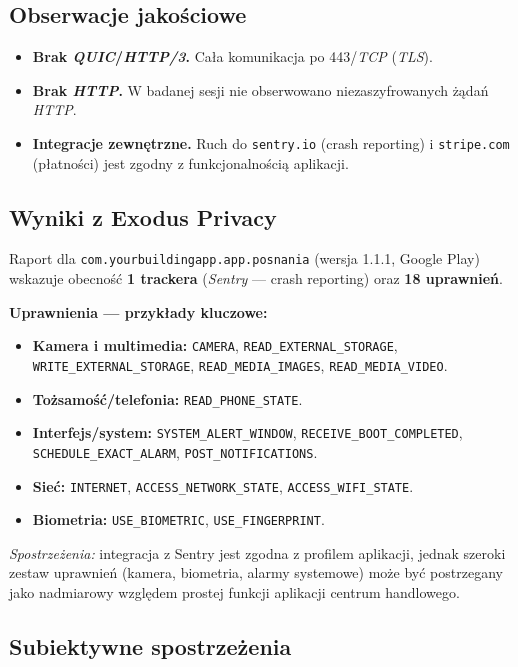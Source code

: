 \subsection{Obserwacje jakościowe}
\begin{itemize}
  \item \textbf{Brak \emph{QUIC}/\emph{HTTP/3}.} Cała komunikacja po 443/\emph{TCP} (\emph{TLS}).
  \item \textbf{Brak \emph{HTTP}.} W badanej sesji nie obserwowano niezaszyfrowanych żądań \emph{HTTP}.
  \item \textbf{Integracje zewnętrzne.} Ruch do \texttt{sentry.io} (crash reporting) i \texttt{stripe.com} (płatności) jest zgodny z funkcjonalnością aplikacji.
\end{itemize}

\subsection{Wyniki z Exodus Privacy \cite{ExodusPrivacy}}
Raport dla \texttt{com.yourbuildingapp.app.posnania} (wersja 1.1.1, Google Play) wskazuje obecność \textbf{1 trackera} (\emph{Sentry} — crash reporting) oraz \textbf{18 uprawnień}. 

\textbf{Uprawnienia — przykłady kluczowe:}
\begin{itemize}
  \item \textbf{Kamera i multimedia:} \texttt{CAMERA}, \texttt{READ\_EXTERNAL\_STORAGE}, \texttt{WRITE\_EXTERNAL\_STORAGE}, \texttt{READ\_MEDIA\_IMAGES}, \texttt{READ\_MEDIA\_VIDEO}.
  \item \textbf{Tożsamość/telefonia:} \texttt{READ\_PHONE\_STATE}.
  \item \textbf{Interfejs/system:} \texttt{SYSTEM\_ALERT\_WINDOW}, \texttt{RECEIVE\_BOOT\_COMPLETED}, \texttt{SCHEDULE\_EXACT\_ALARM}, \texttt{POST\_NOTIFICATIONS}.
  \item \textbf{Sieć:} \texttt{INTERNET}, \texttt{ACCESS\_NETWORK\_STATE}, \texttt{ACCESS\_WIFI\_STATE}.
  \item \textbf{Biometria:} \texttt{USE\_BIOMETRIC}, \texttt{USE\_FINGERPRINT}.
\end{itemize}

\emph{Spostrzeżenia:} integracja z Sentry jest zgodna z profilem aplikacji, jednak szeroki zestaw uprawnień (kamera, biometria, alarmy systemowe) może być postrzegany jako nadmiarowy względem prostej funkcji aplikacji centrum handlowego.

\subsection{Subiektywne spostrzeżenia}
